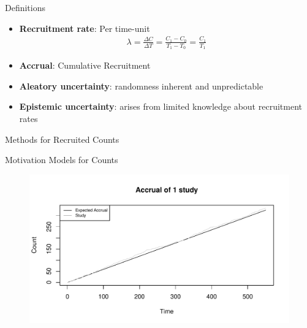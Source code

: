 \documentclass[english]{beamer}\usepackage[]{graphicx}\usepackage[]{xcolor}
\makeatletter
\def\maxwidth{ %
  \ifdim\Gin@nat@width>\linewidth
    \linewidth
  \else
    \Gin@nat@width
  \fi
}
\newenvironment{knitrout}{}{} %
\makeatother
\begin{document}
\begin{frame}{Definitions}

\begin{itemize}
\item \textbf{Recruitment rate}: Per time-unit \citep{piantadosi2024clinical}
\begin{align*}
\lambda = \frac{\Delta C}{\Delta T} = \frac{C_1 - C_0}{T_1 - T_0} = \frac{C_1}{T_1}
\end{align*}

\item \textbf{Accrual}: Cumulative Recruitment
\item \textbf{Aleatory uncertainty}: randomness inherent and unpredictable
\item \textbf{Epistemic uncertainty}: arises from limited knowledge about recruitment rates



\end{itemize}


\end{frame}

\begin{frame}{Methods for Recruited Counts}

\end{frame}

\begin{frame}{Motivation Models for Counts}
\begin{figure}
\begin{knitrout}
\color{fgcolor}
\includegraphics[width=\maxwidth]{figures/figunnamed-chunk-2-1} 
\end{knitrout}

\end{figure}

\end{frame}
\end{document}
